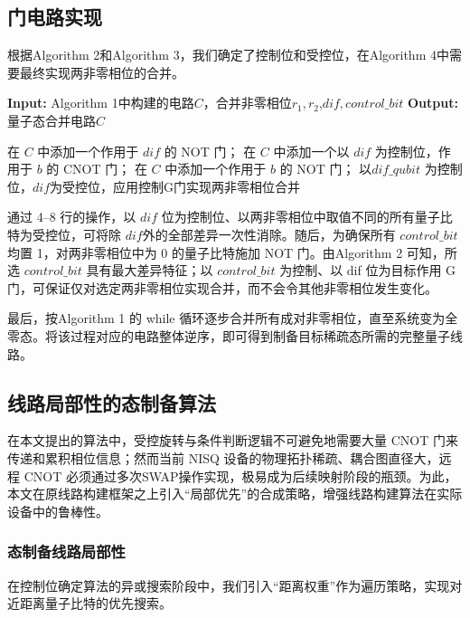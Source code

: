 \documentclass[10.5pt,compsoc,UTF8]{CjC}
\theoremstyle{mystyle}
\begin{document}
\subsection{门电路实现}
根据Algorithm 2和Algorithm 3，我们确定了控制位和受控位，在Algorithm 4中需要最终实现两非零相位的合并。
\begin{algorithm}[H]
\caption{量子线路构建}
\begin{algorithmic}[1]
\State \textbf{Input:} Algorithm 1中构建的电路$C$，合并非零相位$r_1,r_2$,$dif,control\_bit$
\State \textbf{Output:} 量子态合并电路$C$

    \State 在 $C$ 中添加一个作用于 $dif$ 的 NOT 门；
\EndIf
{}
        \State 在 $C$ 中添加一个以 $dif$ 为控制位，作用于 $b$ 的 CNOT 门；
    \EndIf
\EndFor
{}
        \State 在 $C$ 中添加一个作用于 $b$ 的 NOT 门；
    \EndIf
\EndFor
\State 以$dif\_qubit$ 为控制位，$dif$为受控位，应用控制G门实现两非零相位合并
\end{algorithmic}
\end{algorithm}
通过 4–8 行的操作，以 $dif$ 位为控制位、以两非零相位中取值不同的所有量子比特为受控位，可将除 $dif $外的全部差异一次性消除。随后，为确保所有 $control\_bit$ 均置 1，对两非零相位中为 0 的量子比特施加 NOT 门。由Algorithm 2 可知，所选 $control\_bit$ 具有最大差异特征；以 $control\_bit$ 为控制、以 dif 位为目标作用 G 门，可保证仅对选定两非零相位实现合并，而不会令其他非零相位发生变化。\par
最后，按Algorithm 1 的 while 循环逐步合并所有成对非零相位，直至系统变为全零态。将该过程对应的电路整体逆序，即可得到制备目标稀疏态所需的完整量子线路。

\subsection{线路局部性的态制备算法}

在本文提出的算法中，受控旋转与条件判断逻辑不可避免地需要大量 CNOT 门来传递和累积相位信息；然而当前 NISQ 设备的物理拓扑稀疏、耦合图直径大，远程 CNOT 必须通过多次SWAP操作实现，极易成为后续映射阶段的瓶颈。为此，本文在原线路构建框架之上引入“局部优先”的合成策略，增强线路构建算法在实际设备中的鲁棒性。


\subsubsection{\textbf{态制备线路局部性}}
在控制位确定算法的异或搜索阶段中，我们引入“距离权重”作为遍历策略，实现对近距离量子比特的优先搜索。
\end{document}
